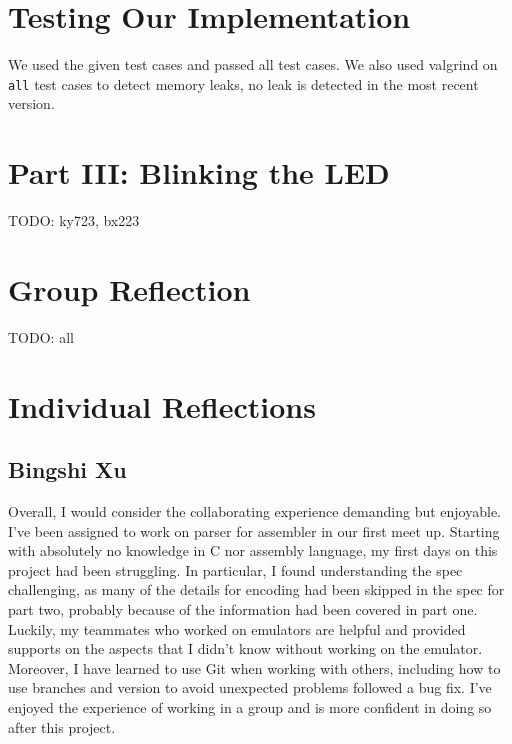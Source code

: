\documentclass[11pt]{article}
\begin{document}
\section{Testing Our Implementation}

We used the given test cases and passed all test cases. We also used valgrind
on \texttt{all} test cases to detect memory leaks, no leak is detected in the
most recent version.

\section{Part III: Blinking the LED}
TODO: ky723, bx223

\section{Group Reflection}

TODO: all\\

\section{Individual Reflections}

\subsection{Bingshi Xu}
Overall, I would consider the collaborating experience demanding but enjoyable.
I've been assigned to work on parser for assembler in our first meet up.
Starting with absolutely no knowledge in C nor assembly language, my first days
on this project had been struggling. In particular, I found understanding the
spec challenging, as many of the details for encoding had been skipped in the
spec for part two, probably because of the information had been covered in part
one. Luckily, my teammates who worked on emulators are helpful and provided
supports on the aspects that I didn't know without working on the emulator.
Moreover, I have learned to use Git when working with others, including how to
use branches and version to avoid unexpected problems followed a bug fix. I've
enjoyed the experience of working in a group and is more confident in doing so
after this project.
\end{document}

